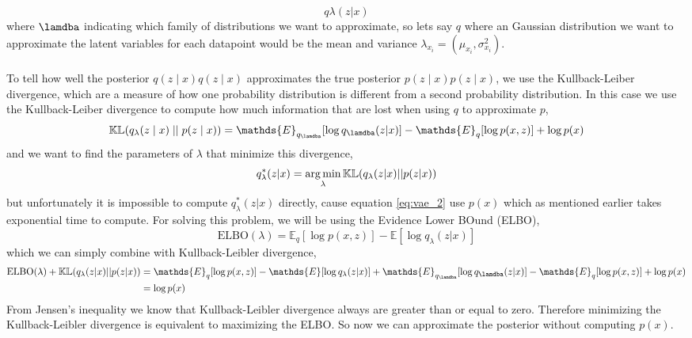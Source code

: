 \documentclass[11pt]{article}
\begin{document}
\begin{equation}
    q \lambda (z | x)
\end{equation}
where $\lamdba$ indicating which family of distributions we want to approximate, so lets say $q$ where an Gaussian distribution we want to approximate the latent variables for each datapoint would be the mean and variance $\lambda_{x_i} = (\mu_{x_i}, \sigma^{2}_{x_i})$.
\\ \\
To tell how well the posterior $q(z \mid x)q(z∣x)$ approximates the true posterior $p(z \mid x)p(z∣x)$, we use the Kullback-Leiber divergence, which are a measure of how one probability distribution is different from a second probability distribution. In this case we use the Kullback-Leiber divergence to compute how much information that are lost when using $q$ to approximate $p$,
\begin{equation}\label{eq:vae_2}
    \mathbb{KL}(q_\lambda(z \mid x) \mid \mid p(z \mid x)) = \mathds{E}_{q_{\lamdba}}[\log q_{\lamdba} (z | x)] - \mathds{E}_{q}[\log p(x, z)] + \log p(x)
\end{equation}
and we want to find the parameters of $\lambda$ that minimize this divergence,
\begin{equation}
    q^{\ast}_{\lambda}(z | x) = \operatorname*{arg\,min}_{\lambda} \mathbb{KL}(q_{\lambda} (z | x) || p(z | x))
\end{equation}
but unfortunately it is impossible to compute $q^{\ast}_{\lambda}(z | x)$ directly, cause equation \ref{eq:vae_2} use $p(x)$ which as mentioned earlier takes exponential time to compute. For solving this problem, we will be using the Evidence Lower BOund (ELBO),
\begin{equation}
    \text{ELBO}(\lambda) = \mathds{E}_{q}[\log p(x, z)] - \mathds{E}[\log q_{\lambda} (z | x)]
\end{equation}
which we can simply combine with  Kullback-Leibler divergence,
\begin{equation}
\begin{split}
    \text{ELBO}(\lambda) + \mathbb{KL}(q_{\lambda} (z | x) || p(z | x)) &= \mathds{E}_{q}[\log p(x, z)] - \mathds{E}[\log q_{\lambda} (z | x)] + \mathds{E}_{q_{\lamdba}}[\log q_{\lamdba} (z | x)] - \mathds{E}_{q}[\log p(x, z)] + \log p(x) \\
    &= \log p(x)
\end{split}
\end{equation}
From Jensen's inequality we know that Kullback-Leibler divergence always are greater than or equal to zero. Therefore minimizing the Kullback-Leibler divergence is equivalent to maximizing the ELBO. So now we can approximate the posterior without computing $p(x)$. 
\end{document}
